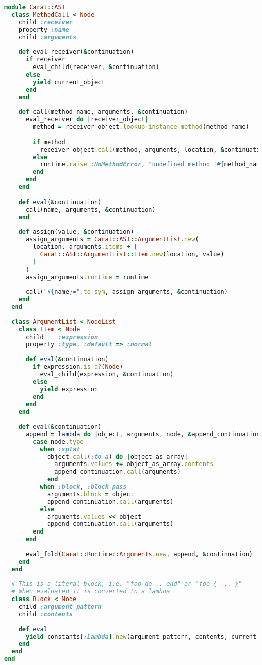 \begin{lstlisting}[title={\small\Helvetica ast/messages.rb},language=Ruby]
module Carat::AST
  class MethodCall < Node
    child :receiver
    property :name
    child :arguments
    
    def eval_receiver(&continuation)
      if receiver
        eval_child(receiver, &continuation)
      else
        yield current_object
      end
    end
    
    def call(method_name, arguments, &continuation)
      eval_receiver do |receiver_object|
        method = receiver_object.lookup_instance_method(method_name)
        
        if method
          receiver_object.call(method, arguments, location, &continuation)
        else
          runtime.raise :NoMethodError, "undefined method '#{method_name}' for object #{receiver_object}", location
        end
      end
    end
    
    def eval(&continuation)
      call(name, arguments, &continuation)
    end
    
    def assign(value, &continuation)
      assign_arguments = Carat::AST::ArgumentList.new(
        location, arguments.items + [
          Carat::AST::ArgumentList::Item.new(location, value)
        ]
      )
      assign_arguments.runtime = runtime
      
      call("#{name}=".to_sym, assign_arguments, &continuation)
    end
  end
  
  class ArgumentList < NodeList
    class Item < Node
      child    :expression
      property :type, :default => :normal
      
      def eval(&continuation)
        if expression.is_a?(Node)
          eval_child(expression, &continuation)
        else
          yield expression
        end
      end
    end
    
    def eval(&continuation)
      append = lambda do |object, arguments, node, &append_continuation|
        case node.type
          when :splat
            object.call(:to_a) do |object_as_array|
              arguments.values += object_as_array.contents
              append_continuation.call(arguments)
            end
          when :block, :block_pass
            arguments.block = object
            append_continuation.call(arguments)
          else
            arguments.values << object
            append_continuation.call(arguments)
        end
      end
      
      eval_fold(Carat::Runtime::Arguments.new, append, &continuation)
    end
  end
  
  # This is a literal block, i.e. "foo do .. end" or "foo { ... }"
  # When evaluated it is converted to a lambda
  class Block < Node
    child :argument_pattern
    child :contents
    
    def eval
      yield constants[:Lambda].new(argument_pattern, contents, current_scope)
    end
  end
end

\end{lstlisting}
